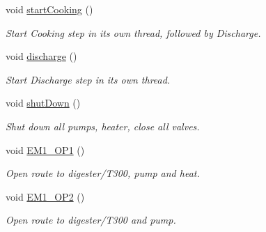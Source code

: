 \begin{DoxyCompactItemize}
\mbox{\label{class_a_s_e6030_1_1_controller_a0bc176e3b374f78d4d1ba4dd7d6542b6}} 
void \hyperlink{class_a_s_e6030_1_1_controller_a0bc176e3b374f78d4d1ba4dd7d6542b6}{start\+Cooking} ()
\begin{DoxyCompactList}\small\item\em Start Cooking step in its own thread, followed by Discharge. \end{DoxyCompactList}\item 
\mbox{\label{class_a_s_e6030_1_1_controller_aa881bbc599467936dbffc03ba2038906}} 
void \hyperlink{class_a_s_e6030_1_1_controller_aa881bbc599467936dbffc03ba2038906}{discharge} ()
\begin{DoxyCompactList}\small\item\em Start Discharge step in its own thread. \end{DoxyCompactList}\item 
void \hyperlink{class_a_s_e6030_1_1_controller_a9ce11137966555bf33690347e1e56cf7}{shut\+Down} ()
\begin{DoxyCompactList}\small\item\em Shut down all pumps, heater, close all valves. \end{DoxyCompactList}\item 
\mbox{\label{class_a_s_e6030_1_1_controller_a2307744a7146425be174ec8acbe80e68}} 
void \hyperlink{class_a_s_e6030_1_1_controller_a2307744a7146425be174ec8acbe80e68}{E\+M1\+\_\+\+O\+P1} ()
\begin{DoxyCompactList}\small\item\em Open route to digester/\+T300, pump and heat. \end{DoxyCompactList}\item 
\mbox{\label{class_a_s_e6030_1_1_controller_a136dfb3ec3897fbec64840958f841b46}} 
void \hyperlink{class_a_s_e6030_1_1_controller_a136dfb3ec3897fbec64840958f841b46}{E\+M1\+\_\+\+O\+P2} ()
\begin{DoxyCompactList}\small\item\em Open route to digester/\+T300 and pump. \end{DoxyCompactList}\item 
\mbox{\label{class_a_s_e6030_1_1_controller_ada67e644ad325022d583ccb45c8bc979}} 

\end{DoxyCompactItemize}
